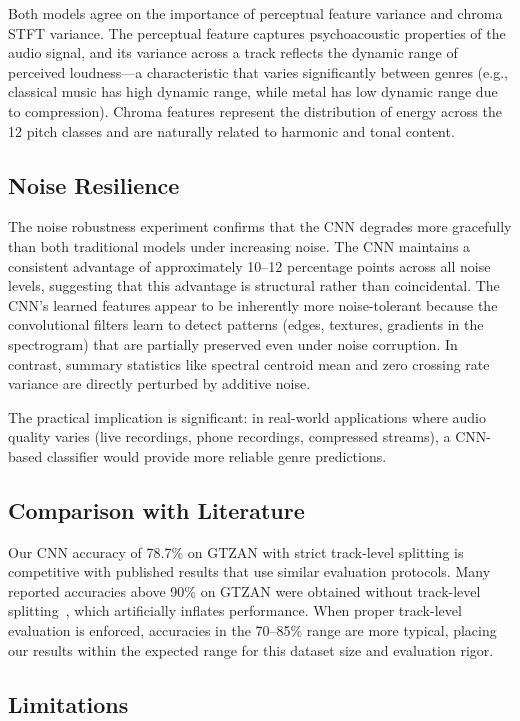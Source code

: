 \documentclass[10pt,journal]{IEEEtran}
\begin{document}
Both models agree on the importance of perceptual feature variance and chroma STFT variance. The perceptual feature captures psychoacoustic properties of the audio signal, and its variance across a track reflects the dynamic range of perceived loudness---a characteristic that varies significantly between genres (e.g., classical music has high dynamic range, while metal has low dynamic range due to compression). Chroma features represent the distribution of energy across the 12 pitch classes and are naturally related to harmonic and tonal content.

\subsection{Noise Resilience}

The noise robustness experiment confirms that the CNN degrades more gracefully than both traditional models under increasing noise. The CNN maintains a consistent advantage of approximately 10--12 percentage points across all noise levels, suggesting that this advantage is structural rather than coincidental. The CNN's learned features appear to be inherently more noise-tolerant because the convolutional filters learn to detect patterns (edges, textures, gradients in the spectrogram) that are partially preserved even under noise corruption. In contrast, summary statistics like spectral centroid mean and zero crossing rate variance are directly perturbed by additive noise.

The practical implication is significant: in real-world applications where audio quality varies (live recordings, phone recordings, compressed streams), a CNN-based classifier would provide more reliable genre predictions.

\subsection{Comparison with Literature}

Our CNN accuracy of 78.7\% on GTZAN with strict track-level splitting is competitive with published results that use similar evaluation protocols. Many reported accuracies above 90\% on GTZAN were obtained without track-level splitting~\cite{sturm2013gtzan}, which artificially inflates performance. When proper track-level evaluation is enforced, accuracies in the 70--85\% range are more typical, placing our results within the expected range for this dataset size and evaluation rigor.

\subsection{Limitations}
\end{document}
